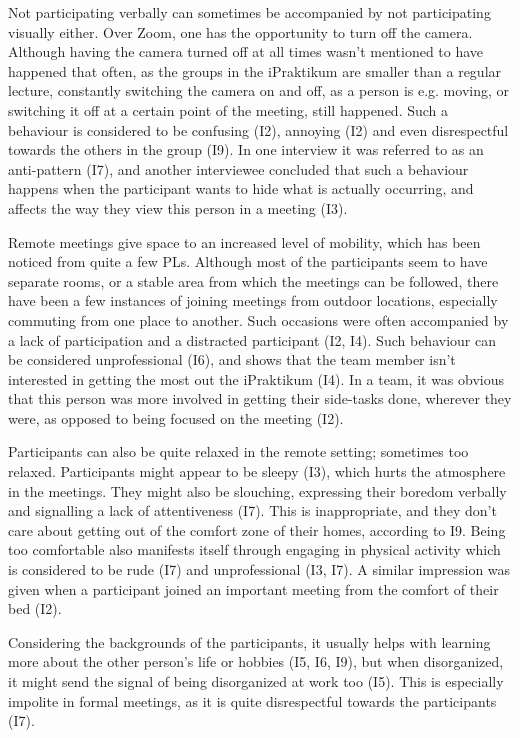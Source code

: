 Not participating verbally can sometimes be accompanied by not participating visually either. Over Zoom, one has the opportunity to turn off the camera. Although having the camera turned off at all times wasn't mentioned to have happened that often, as the groups in the iPraktikum are smaller than a regular lecture, constantly switching the camera on and off, as a person is e.g. moving, or switching it off at a certain point of the meeting, still happened. Such a behaviour is considered to be confusing (I2), annoying (I2) and even disrespectful towards the others in the group (I9). In one interview it was referred to as an anti-pattern (I7), and another interviewee concluded that such a behaviour happens when the participant wants to hide what is actually occurring, and affects the way they view this person in a meeting (I3). 

Remote meetings give space to an increased level of mobility, which has been noticed from quite a few PLs. Although most of the participants seem to have separate rooms, or a stable area from which the meetings can be followed, there have been a few instances of joining meetings from outdoor locations, especially commuting from one place to another. Such occasions were often accompanied by a lack of participation and a distracted participant (I2, I4). Such behaviour can be considered unprofessional (I6), and shows that the team member isn't interested in getting the most out the iPraktikum (I4). In a team, it was obvious that this person was more involved in getting their side-tasks done, wherever they were, as opposed to being focused on the meeting (I2).

Participants can also be quite relaxed in the remote setting; sometimes too relaxed. Participants might appear to be sleepy (I3), which hurts the atmosphere in the meetings. They might also be slouching, expressing their boredom verbally and signalling a lack of attentiveness (I7). This is inappropriate, and they don't care about getting out of the comfort zone of their homes, according to I9. Being too comfortable also manifests itself through engaging in physical activity which is considered to be rude (I7) and unprofessional (I3, I7). A similar impression was given when a participant joined an important meeting from the comfort of their bed (I2).

Considering the backgrounds of the participants, it usually helps with learning more about the other person's life or hobbies (I5, I6, I9), but when disorganized, it might send the signal of being disorganized at work too (I5). This is especially impolite in formal meetings, as it is quite disrespectful towards the participants (I7).

